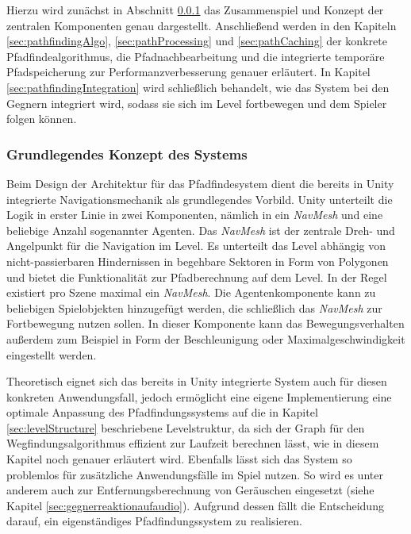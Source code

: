 Hierzu wird zunächst in Abschnitt \ref{sec:pathfindingConcept} das Zusammenspiel und Konzept der zentralen Komponenten genau dargestellt.
Anschließend werden in den Kapiteln \ref{sec:pathfindingAlgo}, \ref{sec:pathProcessing} und \ref{sec:pathCaching} der konkrete Pfadfindealgorithmus, die Pfadnachbearbeitung und die integrierte temporäre Pfadspeicherung zur Performanzverbesserung genauer erläutert. In Kapitel \ref{sec:pathfindingIntegration} wird schließlich behandelt, wie das System bei den Gegnern integriert wird, sodass sie sich im Level fortbewegen und dem Spieler folgen können.

\subsubsection{Grundlegendes Konzept des Systems}\label{sec:pathfindingConcept}
Beim Design der Architektur für das Pfadfindesystem dient die bereits in Unity integrierte Navigationsmechanik \cite{Unity_Doc_Navmesh} als grundlegendes Vorbild. Unity unterteilt die Logik in erster Linie in zwei Komponenten, nämlich in ein \textit{NavMesh} und eine beliebige Anzahl sogenannter Agenten. Das \textit{NavMesh} ist der zentrale Dreh- und Angelpunkt für die Navigation im Level. Es unterteilt das Level abhängig von nicht-passierbaren Hindernissen in begehbare Sektoren in Form von Polygonen und bietet die Funktionalität zur Pfadberechnung auf dem Level. In der Regel existiert pro Szene maximal ein \textit{NavMesh}. Die Agentenkomponente kann zu beliebigen Spielobjekten hinzugefügt werden, die schließlich das \textit{NavMesh} zur Fortbewegung nutzen sollen. In dieser Komponente kann das Bewegungsverhalten außerdem zum Beispiel in Form der Beschleunigung oder Maximalgeschwindigkeit eingestellt werden.

Theoretisch eignet sich das bereits in Unity integrierte System auch für diesen konkreten Anwendungsfall, jedoch ermöglicht eine eigene Implementierung eine optimale Anpassung des Pfadfindungssystems auf die in Kapitel \ref{sec:levelStructure} beschriebene Levelstruktur, da sich der Graph für den Wegfindungsalgorithmus effizient zur Laufzeit berechnen lässt, wie in diesem Kapitel noch genauer erläutert wird. Ebenfalls lässt sich das System so problemlos für zusätzliche Anwendungsfälle im Spiel nutzen. So wird es unter anderem auch zur Entfernungsberechnung von Geräuschen eingesetzt (siehe Kapitel \ref{sec:gegnerreaktionaufaudio}). Aufgrund dessen fällt die Entscheidung darauf, ein eigenständiges Pfadfindungssystem zu realisieren.

